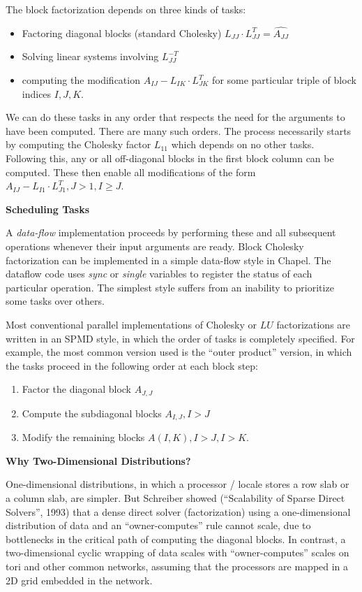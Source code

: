 \documentclass[10pt]{article}
\begin{document}
The block factorization depends on three kinds of tasks:
\begin{itemize}
\item Factoring diagonal blocks (standard Cholesky) 
  $L_{JJ} \cdot L_{JJ}^T = \widehat{A_{JJ}}$
\item Solving linear systems involving $L_{JJ}^{-T}$
\item computing the modification $A_{IJ} - L_{IK} \cdot L_{JK}^T$ for some
  particular triple of block indices $I, J, K$.
\end{itemize}
We can do these tasks in any order that respects the need for the arguments to
have been computed.  There are many such orders.  The process necessarily starts
by computing the Cholesky factor $L_{11}$ which depends on no other tasks.
Following this, any or all off-diagonal blocks in the first block column can be
computed.  These then enable all modifications of the form $A_{IJ} - L_{I1}
\cdot L_{J1}^T, J > 1, I \ge J$.

{\large \bf Scheduling Tasks}

A \emph{data-flow} implementation proceeds by performing these and all
subsequent operations whenever their input arguments are ready.  Block Cholesky
factorization can be implemented in a simple data-flow style in Chapel.  The
dataflow code uses \emph{sync} or \emph{single} variables to register the status
of each particular operation.  The simplest style suffers from an inability to
prioritize some tasks over others.

Most conventional parallel implementations of Cholesky or $LU$ factorizations
are written in an SPMD style, in which the order of tasks is completely
specified.  For example, the most common version used is the ``outer product''
version, in which the tasks proceed in the following order at each block step:

\begin{enumerate}
\item Factor the diagonal block $A_{J,J}$
\item Compute the subdiagonal blocks $A_{I,J}, I>J$
\item Modify the remaining blocks $A(I,K), I>J, I>K$.
\end{enumerate}

{\large \bf Why Two-Dimensional Distributions?}

One-dimensional distributions, in which a processor / locale stores a row slab
or a column slab, are simpler.  But Schreiber showed (``Scalability of Sparse
Direct Solvers'', 1993) that a dense direct solver (factorization) using a
one-dimensional distribution of data and an ``owner-computes'' rule cannot
scale, due to bottlenecks in the critical path of computing the diagonal blocks.
In contrast, a two-dimensional cyclic wrapping of data scales with
``owner-computes'' scales on tori and other common networks, assuming that the
processors are mapped in a 2D grid embedded in the network.
\end{document}

